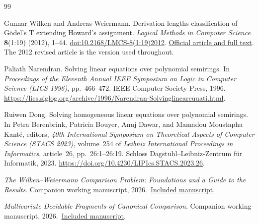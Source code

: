 \begin{thebibliography}{99}

Gunnar Wilken and Andreas Weiermann.
Derivation lengths classification of G\"odel's T extending Howard's assignment.
\emph{Logical Methods in Computer Science} \textbf{8}(1:19) (2012), 1--44.
\href{https://doi.org/10.2168/LMCS-8(1:19)2012}
{doi:10.2168/LMCS-8(1:19)2012}.
\href{https://lmcs.episciences.org/1073}{Official article and full text}.
The 2012 revised article is the version used throughout.

Paliath Narendran.
Solving linear equations over polynomial semirings.
In \emph{Proceedings of the Eleventh Annual IEEE Symposium on Logic in
Computer Science (LICS 1996)}, pp.~466--472.
IEEE Computer Society Press, 1996.
\url{https://lics.siglog.org/archive/1996/Narendran-Solvinglinearequati.html}.

Ruiwen Dong.
Solving homogeneous linear equations over polynomial semirings.
In Petra Berenbrink, Patricia Bouyer, Anuj Dawar, and
Mamadou Moustapha Kant\'e, editors,
\emph{40th International Symposium on Theoretical Aspects of Computer Science
(STACS 2023)}, volume~254 of \emph{Leibniz International Proceedings in
Informatics}, article~26, pp.~26:1--26:19.
Schloss Dagstuhl--Leibniz-Zentrum f\"ur Informatik, 2023.
\url{https://doi.org/10.4230/LIPIcs.STACS.2023.26}.

\emph{The Wilken--Weiermann Comparison Problem: Foundations and a Guide to the Results}. Companion working manuscript, 2026.\
\href{../05-wilken-weiermann-foundations/paper.pdf}{Included manuscript}.

\emph{Multivariate Decidable Fragments of Canonical Comparison}. Companion working manuscript, 2026.\
\href{../08-multivariate-collapse-comparison/paper.pdf}{Included manuscript}.
\end{thebibliography}
